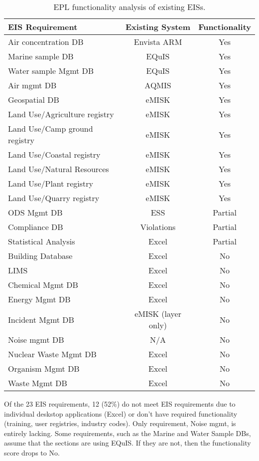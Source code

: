 \begin{table}[H]
\centering
\caption{EPL functionality analysis of existing EISs.}
\label{tab:eplfunc}
\begin{tabular}{@{}lcc@{}}
\toprule
\textbf{EIS Requirement} & \textbf{Existing System} & \textbf{Functionality} \\ \midrule
Air concentration DB & Envista ARM & Yes \\
Marine sample DB & EQuIS & Yes \\
Water sample Mgmt DB & EQuIS & Yes \\
Air mgmt DB & AQMIS & Yes \\
Geospatial DB & eMISK & Yes \\
Land Use/Agriculture registry & eMISK & Yes \\
Land Use/Camp ground registry & eMISK & Yes \\
Land Use/Coastal registry & eMISK & Yes \\
Land Use/Natural Resources & eMISK & Yes \\
Land Use/Plant registry & eMISK & Yes \\
Land Use/Quarry registry & eMISK & Yes \\
ODS Mgmt DB & ESS & Partial \\
Compliance DB & Violations & Partial \\
Statistical Analysis & Excel & Partial \\
Building Database & Excel & No \\
LIMS & Excel & No \\
Chemical Mgmt DB & Excel & No \\
Energy Mgmt DB & Excel & No \\
Incident Mgmt DB & eMISK (layer only) & No \\
Noise mgmt DB & N/A & No \\
Nuclear Waste Mgmt DB & Excel & No \\
Organism Mgmt DB & Excel & No \\
Waste Mgmt DB & Excel & No \\ \bottomrule
\end{tabular}
\end{table}

Of the 23 EIS  requirements, 12 (52\%) do not meet EIS requirements due to individual deskstop applications (Excel) or don't have required functionality (training, user registries, industry codes). Only requirement, Noise mgmt, is entirely lacking. Some requirements, such as the Marine and Water Sample DBs, assume that the sections are using EQuIS. If they are not, then the functionality score drops to No.

